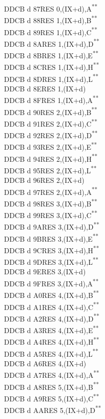 \documentclass[12pt,twoside,openright,a4paper]{book}
\newcommand{\UNDOC}{\textnormal{\textsuperscript{**}}}
\begin{document}
\begin{multicols}{3}
{\begin{tabbing}
	DDCB d 87\>RES 0,(IX+d),A\UNDOC\\
	DDCB d 88\>RES 1,(IX+d),B\UNDOC\\
	DDCB d 89\>RES 1,(IX+d),C\UNDOC\\
	DDCB d 8A\>RES 1,(IX+d),D\UNDOC\\
	DDCB d 8B\>RES 1,(IX+d),E\UNDOC\\
	DDCB d 8C\>RES 1,(IX+d),H\UNDOC\\
	DDCB d 8D\>RES 1,(IX+d),L\UNDOC\\
	DDCB d 8E\>RES 1,(IX+d)\\
	DDCB d 8F\>RES 1,(IX+d),A\UNDOC\\
	DDCB d 90\>RES 2,(IX+d),B\UNDOC\\
	DDCB d 91\>RES 2,(IX+d),C\UNDOC\\
	DDCB d 92\>RES 2,(IX+d),D\UNDOC\\
	DDCB d 93\>RES 2,(IX+d),E\UNDOC\\
	DDCB d 94\>RES 2,(IX+d),H\UNDOC\\
	DDCB d 95\>RES 2,(IX+d),L\UNDOC\\
	DDCB d 96\>RES 2,(IX+d)\\
	DDCB d 97\>RES 2,(IX+d),A\UNDOC\\
	DDCB d 98\>RES 3,(IX+d),B\UNDOC\\
	DDCB d 99\>RES 3,(IX+d),C\UNDOC\\
	DDCB d 9A\>RES 3,(IX+d),D\UNDOC\\
	DDCB d 9B\>RES 3,(IX+d),E\UNDOC\\
	DDCB d 9C\>RES 3,(IX+d),H\UNDOC\\
	DDCB d 9D\>RES 3,(IX+d),L\UNDOC\\
	DDCB d 9E\>RES 3,(IX+d)\\
	DDCB d 9F\>RES 3,(IX+d),A\UNDOC\\
	DDCB d A0\>RES 4,(IX+d),B\UNDOC\\
	DDCB d A1\>RES 4,(IX+d),C\UNDOC\\
	DDCB d A2\>RES 4,(IX+d),D\UNDOC\\
	DDCB d A3\>RES 4,(IX+d),E\UNDOC\\
	DDCB d A4\>RES 4,(IX+d),H\UNDOC\\
	DDCB d A5\>RES 4,(IX+d),L\UNDOC\\
	DDCB d A6\>RES 4,(IX+d)\\
	DDCB d A7\>RES 4,(IX+d),A\UNDOC\\
	DDCB d A8\>RES 5,(IX+d),B\UNDOC\\
	DDCB d A9\>RES 5,(IX+d),C\UNDOC\\
	DDCB d AA\>RES 5,(IX+d),D\UNDOC\\

\end{tabbing}}
\end{multicols}
\end{document}
